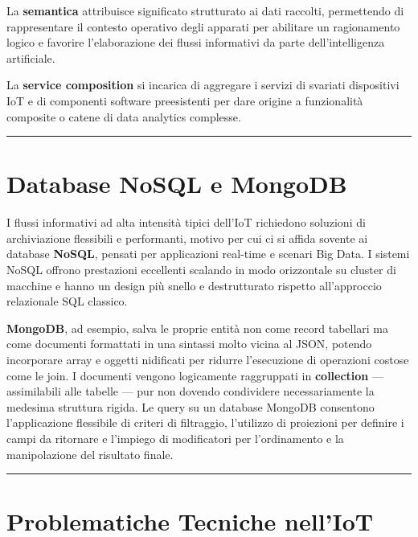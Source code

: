 \documentclass[
  italian,
  openany]{book}
\begin{document}
La \textbf{semantica} attribuisce significato strutturato ai dati
raccolti, permettendo di rappresentare il contesto operativo degli
apparati per abilitare un ragionamento logico e favorire l'elaborazione
dei flussi informativi da parte dell'intelligenza artificiale.

La \textbf{service composition} si incarica di aggregare i servizi di
svariati dispositivi IoT e di componenti software preesistenti per dare
origine a funzionalità composite o catene di data analytics complesse.

\begin{center}\rule{0.5\linewidth}{0.5pt}\end{center}

\section{Database NoSQL e MongoDB}\label{database-nosql-e-mongodb}

I flussi informativi ad alta intensità tipici dell'IoT richiedono
soluzioni di archiviazione flessibili e performanti, motivo per cui ci
si affida sovente ai database \textbf{NoSQL}, pensati per applicazioni
real-time e scenari Big Data. I sistemi NoSQL offrono prestazioni
eccellenti scalando in modo orizzontale su cluster di macchine e hanno
un design più snello e destrutturato rispetto all'approccio relazionale
SQL classico.

\textbf{MongoDB}, ad esempio, salva le proprie entità non come record
tabellari ma come documenti formattati in una sintassi molto vicina al
JSON, potendo incorporare array e oggetti nidificati per ridurre
l'esecuzione di operazioni costose come le join. I documenti vengono
logicamente raggruppati in \textbf{collection} --- assimilabili alle
tabelle --- pur non dovendo condividere necessariamente la medesima
struttura rigida. Le query su un database MongoDB consentono
l'applicazione flessibile di criteri di filtraggio, l'utilizzo di
proiezioni per definire i campi da ritornare e l'impiego di modificatori
per l'ordinamento e la manipolazione del risultato finale.

\begin{center}\rule{0.5\linewidth}{0.5pt}\end{center}

\section{Problematiche Tecniche
nell'IoT}\label{problematiche-tecniche-nelliot}
\end{document}
